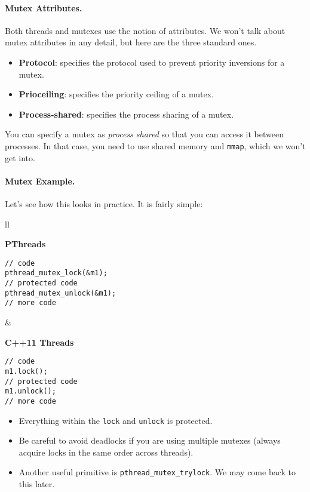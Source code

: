 \paragraph{Mutex Attributes.} Both threads and mutexes use the notion of attributes.
We won't talk about mutex attributes in any detail, but here are the three standard ones.
  \begin{itemize}
    \item {\bf Protocol}: specifies the protocol used to prevent priority
      inversions for a mutex.
    \item {\bf Prioceiling}: specifies the priority ceiling of a mutex.
    \item {\bf Process-shared}: specifies the process sharing of a mutex.
  \end{itemize}
  You can specify a mutex as {\it process shared} so that you can access it
  between processes. In that case, you need to use shared memory and {\tt mmap},
  which we won't get into.

  \paragraph{Mutex Example.} Let's see how this looks in practice. It is fairly simple:
  
    \begin{tabular}{ll}
      \begin{minipage}{.5\textwidth}
        {\bf PThreads}
  \begin{verbatim}
// code
pthread_mutex_lock(&m1);
// protected code
pthread_mutex_unlock(&m1);
// more code
  \end{verbatim}
      \end{minipage}&
      \begin{minipage}{.35\textwidth}
        {\bf C++11 Threads}
  \begin{verbatim}
// code
m1.lock();
// protected code
m1.unlock();
// more code
  \end{verbatim}
      \end{minipage}
    \end{tabular}
  \begin{itemize}
    \item Everything within the {\tt lock} and {\tt unlock} is protected.
    \item Be careful to avoid deadlocks if you are using multiple mutexes (always
acquire locks in the same order across threads).
    \item Another useful primitive is {\tt pthread\_mutex\_trylock}. We may come back to this
later.
  \end{itemize}

